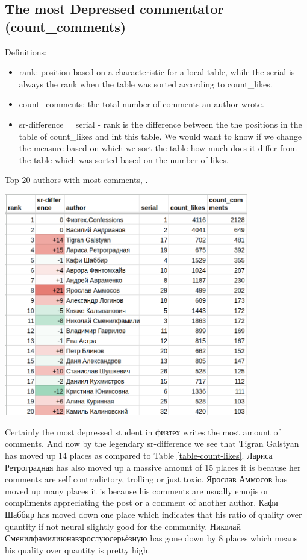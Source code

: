 \documentclass[
	11pt
] {article}
\begin{document}
\subsection{The most Depressed commentator (count\_comments)}
	Definitions:
	\begin{itemize}
		\item rank: position based on a characteristic for a local table, while the serial is always the rank when the table was sorted according to count\_likes.
		\item count\_comments: the total number of comments an author wrote.
		\item sr-difference = serial - rank is the difference between the the positions in the table of count\_likes and int this table. We would want to know if we change the measure based on which we sort the table how much does it differ from the table which was sorted based on the number of likes.
	\end{itemize}

	\begin{table}[H]
		\centering
		\caption{Top-20 authors with most comments, \cite{sheet-count-comments}.}
		\label{table-count-comments}
		\includegraphics[width=0.8\textwidth]{table-count-comments-818}
	\end{table}

	Certainly the most depressed student in физтех writes the most amount of comments. And now by the legendary sr-difference we see that Tigran Galstyan has moved up 14 places as compared to Table \ref{table-count-likes}. Лариса Ретроградная has also moved up a massive amount of 15 places it is because her comments are self contradictory, trolling or just toxic. Ярослав Аммосов has moved up many places it is because his comments are usually emojis or compliments appreciating the post or a comment of another author. Кафи Шаббир has moved down one place which indicates that his ratio of quality over quantity if not neural slightly good for the community. Николай Сменилфамилиюнавзрослуюсерьёзную has gone down by 8 places which means his quality over quantity is pretty high.
\end{document}

